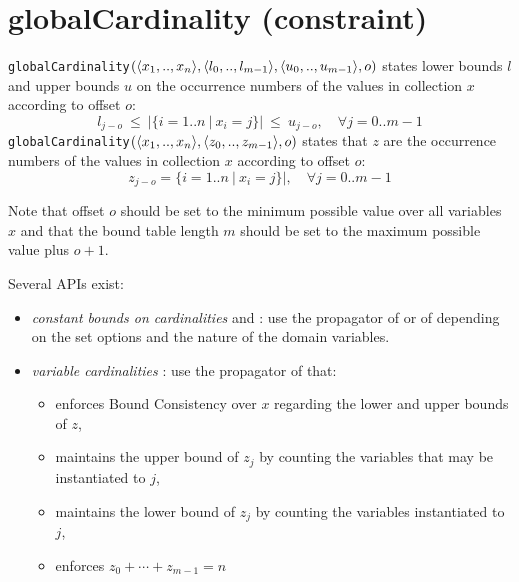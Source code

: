 \label{globalcardinality}
\hypertarget{globalcardinality}{}

\section{globalCardinality (constraint)}\label{globalcardinality:globalcardinalityconstraint}\hypertarget{globalcardinality:globalcardinalityconstraint}{}
\begin{notedef}
  \texttt{globalCardinality}$(\langle x_1,..,x_n\rangle,\langle l_0,..,l_{m-1}\rangle, \langle u_0,..,u_{m-1}\rangle, o)$ states lower bounds $l$ and upper bounds $u$ on the occurrence numbers of the values in collection $x$ according to offset $o$: 
$$l_{j-o}\ \le\ |\{i=1..n\ |\ x_i=j\}|\ \le\ u_{j-o},\quad\forall j=0..m-1$$   
  \texttt{globalCardinality}$(\langle x_1,..,x_n\rangle,\langle z_0,..,z_{m-1}\rangle, o)$ states that $z$ are the occurrence numbers of the values in collection $x$ according to offset $o$: 
$$z_{j-o} = \{i=1..n\ |\ x_i=j\}|,\quad\forall j=0..m-1$$   
\end{notedef}
Note that offset $o$ should be set to the minimum possible value over all variables $x$ and that the bound table length $m$ should be set to the maximum possible value plus $o+1$.

Several APIs exist:
\begin{itemize}
	\item \emph{constant bounds on cardinalities}  and : use the propagator of \cite{ReginAAAI96} or of \cite{QuimperCP03} depending on the set options and the nature of the domain variables.
	\item \emph{variable cardinalities} : use the propagator of \cite{QuimperCP03} that:      
      \begin{itemize}
      \item enforces Bound Consistency over $x$ regarding the lower and upper bounds of $z$, 
      \item maintains the upper bound of $z_j$ by counting the variables that may be instantiated to $j$, 
      \item maintains the lower bound of $z_j$ by counting the variables instantiated to $j$, 
      \item enforces $z_0 + \cdots + z_{m-1} = n$
      \end{itemize}
\end{itemize}


